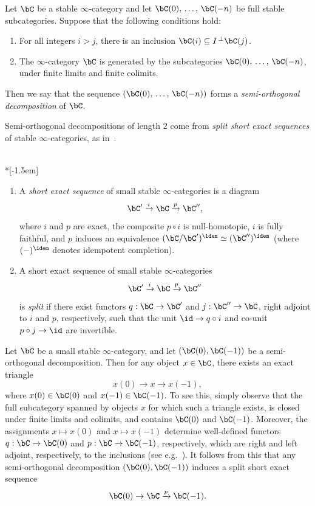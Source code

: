 \begin{defi}\label{defn:SOD}
Let $\bC$ be a stable $\infty$-category and let $\bC(0),\,\ldots,\,\bC(-n)$ be full stable subcategories. Suppose that the following conditions hold:
\begin{enumerate}\romanenumi
\item For all integers $i>j$, there is an inclusion $\bC(i) \subseteq I\,^\perp\bC(j)$.
\item The $\infty$-category $\bC$ is generated by the subcategories $\bC(0),\,\ldots,\,\bC(-n)$, under finite limits and finite colimits.
\end{enumerate}
Then we say that the sequence $(\bC(0),\,\ldots,\,\bC(-n))$ forms a \emph{semi-orthogonal decomposition} of $\bC$.
\end{defi}

Semi-orthogonal decompositions of length $2$ come from \emph{split short exact sequences} of stable $\infty$-categories, as in~\cite{BlumbergGepnerTabuada}.

\begin{defi} \ \\*[-1.5em]%
\begin{enumerate}\romanenumi
\item A \emph{short exact sequence} of small stable $\infty$-categories is a diagram
\[
\bC' \xrightarrow{i} \bC \xrightarrow{p} \bC'',
\]
where $i$ and $p$ are exact, the composite $p\circ i$ is null-homotopic, $i$ is fully faithful, and $p$ induces an equivalence $(\bC/\bC')^\idem \simeq (\bC'')^\idem$ (where $(-)^\idem$ denotes idempotent completion).
\item A short exact sequence of small stable $\infty$-categories
\[
\bC' \xrightarrow{i} \bC \xrightarrow{p} \bC''
\]
is \emph{split} if there exist functors $q : \bC \to \bC'$ and $j : \bC'' \to \bC$, right adjoint to $i$ and $p$, respectively, such that the unit $\id \to q\circ i$ and co-unit $p\circ j \to \id$ are invertible.
\end{enumerate}
\end{defi}

\begin{rema}\label{rem:SOD to split SES}
Let $\bC$ be a small stable $\infty$-category, and let $(\bC(0), \bC(-1))$ be a semi-orthogonal decomposition. Then for any object $x \in \bC$, there exists an exact triangle
\[
x(0) \to x \to x(-1),
\]
where $x(0) \in \bC(0)$ and $x(-1) \in \bC(-1)$. To see this, simply observe that the full subcategory spanned by objects $x$ for which such a triangle exists, is closed under finite limits and colimits, and contains $\bC(0)$ and $\bC(-1)$. Moreover, the assignments $x \mapsto x(0)$ and $x \mapsto x(-1)$ determine well-defined functors $q : \bC \to \bC(0)$ and $p : \bC \to \bC(-1)$, respectively, which are right and left adjoint, respectively, to the inclusions (see e.g.~\cite[Remark~7.2.0.2]{SAG-20180204}). It follows from this that any semi-orthogonal decomposition $(\bC(0),\bC(-1))$ induces a split short exact sequence
\[
\bC(0) \to \bC \xrightarrow{p} \bC(-1).
\]
\end{rema}

